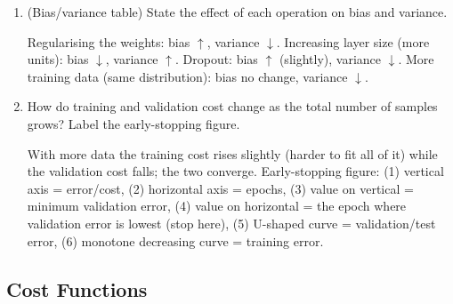\documentclass[10pt,a4paper]{article}
\newcommand{\q}[1]{\item #1}
\begin{document}
\begin{enumerate}[leftmargin=*,label=\textbf{Q\arabic*.}]
\q (Bias/variance table) State the effect of each operation on bias and variance.
\begin{answerbox}
Regularising the weights: bias $\uparrow$, variance $\downarrow$. Increasing layer size (more units): bias $\downarrow$, variance $\uparrow$. Dropout: bias $\uparrow$ (slightly), variance $\downarrow$. More training data (same distribution): bias no change, variance $\downarrow$.
\end{answerbox}

\q How do training and validation cost change as the total number of samples grows? Label the early-stopping figure.
\begin{answerbox}
With more data the training cost rises slightly (harder to fit all of it) while the validation cost falls; the two converge. Early-stopping figure: (1) vertical axis = error/cost, (2) horizontal axis = epochs, (3) value on vertical = minimum validation error, (4) value on horizontal = the epoch where validation error is lowest (stop here), (5) U-shaped curve = validation/test error, (6) monotone decreasing curve = training error.
\end{answerbox}

\end{enumerate}

\subsection{Cost Functions}
\end{document}
